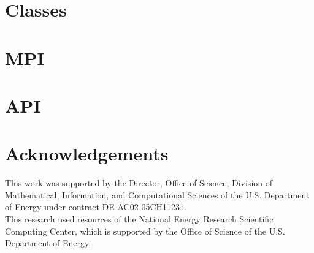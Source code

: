 \documentclass{article}
\begin{document}
\section{Classes}
\section{MPI}
\section{API}

\section{Acknowledgements}
This work was supported by the Director, Office of Science, Division of
Mathematical, Information, and Computational Sciences of the U.S. Department of
Energy under contract DE-AC02-05CH11231.\\

This research used resources of the National Energy Research Scientific
Computing Center, which is supported by the Office of Science of the U.S.
Department of Energy.
\end{document}
